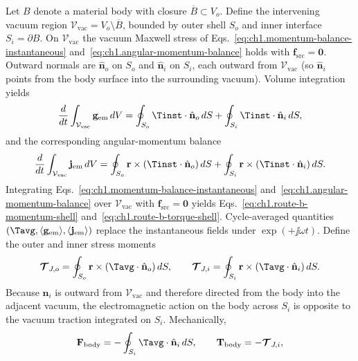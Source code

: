 Let $B$ denote a material body with closure $\overline{B}\subset V_o$. Define the intervening vacuum region $\mathcal{V}_{\mathrm{vac}}=V_o\setminus\overline{B}$, bounded by outer shell $S_o$ and inner interface $S_i=\partial B$. On $\mathcal{V}_{\mathrm{vac}}$ the vacuum Maxwell stress of Eqs.~\eqref{eq:ch1.momentum-balance-instantaneous} and~\eqref{eq:ch1.angular-momentum-balance} holds with $\mathbf{f}_{\mathrm{src}}=\mathbf{0}$. Outward normals are $\hat{\mathbf{n}}_o$ on $S_o$ and $\hat{\mathbf{n}}_i$ on $S_i$, each outward from $\mathcal{V}_{\mathrm{vac}}$ (so $\hat{\mathbf{n}}_i$ points from the body surface into the surrounding vacuum). Volume integration yields
\begin{equation}
\label{eq:ch1.route-b-momentum-shell}
\frac{d}{dt}\int_{\mathcal{V}_{\mathrm{vac}}}\mathbf{g}_{\mathrm{em}}\,dV
=\oint_{S_o}\Tinst\cdot\hat{\mathbf{n}}_o\,dS
+\oint_{S_i}\Tinst\cdot\hat{\mathbf{n}}_i\,dS,
\end{equation}
and the corresponding angular-momentum balance
\begin{equation}
\label{eq:ch1.route-b-torque-shell}
\frac{d}{dt}\int_{\mathcal{V}_{\mathrm{vac}}}\mathbf{j}_{\mathrm{em}}\,dV
=\oint_{S_o}\mathbf{r}\times(\Tinst\cdot\hat{\mathbf{n}}_o)\,dS
+\oint_{S_i}\mathbf{r}\times(\Tinst\cdot\hat{\mathbf{n}}_i)\,dS.
\end{equation}
Integrating Eqs.~\eqref{eq:ch1.momentum-balance-instantaneous} and~\eqref{eq:ch1.angular-momentum-balance} over $\mathcal{V}_{\mathrm{vac}}$ with $\mathbf{f}_{\mathrm{src}}=\mathbf{0}$ yields Eqs.~\eqref{eq:ch1.route-b-momentum-shell} and~\eqref{eq:ch1.route-b-torque-shell}. Cycle-averaged quantities $(\Tavg,\langle\mathbf{g}_{\mathrm{em}}\rangle,\langle\mathbf{j}_{\mathrm{em}}\rangle)$ replace the instantaneous fields under $\exp(+\jj\omega t)$. Define the outer and inner stress moments
\[
\boldsymbol{\mathcal{T}}_{J,o}=\oint_{S_o}\mathbf{r}\times(\Tavg\cdot\hat{\mathbf{n}}_o)\,dS,\qquad
\boldsymbol{\mathcal{T}}_{J,i}=\oint_{S_i}\mathbf{r}\times(\Tavg\cdot\hat{\mathbf{n}}_i)\,dS.
\]
Because $\hat{\mathbf{n}}_i$ is outward from $\mathcal{V}_{\mathrm{vac}}$ and therefore directed from the body into the adjacent vacuum, the electromagnetic action on the body across $S_i$ is opposite to the vacuum traction integrated on $S_i$. Mechanically,
\begin{equation}
\label{eq:ch1.route-b-body-force}
\mathbf{F}_{\mathrm{body}}=-\oint_{S_i}\Tavg\cdot\hat{\mathbf{n}}_i\,dS,
\qquad
\mathbf{T}_{\mathrm{body}}=-\boldsymbol{\mathcal{T}}_{J,i},
\end{equation}
